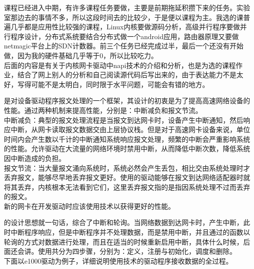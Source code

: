 \documentclass[fontsize=11pt, %
                             paper=a4, %
                             oneside, %
                             captions=tableheading,
                             index=totoc,
                             hyperref]{labbook}
\begin{document}
\begin{addmargin}[0cm]{0cm} %

\pagestyle{scrheadings} %

\indent 课程已经进入中期，有许多课程任务要做，主要是前期拖延积攒下来的任务。实验室那边去的事情不多，所以这段时间去的比较少，于是便以课程为主。我选的课普遍几乎都是应用性比较强的课程，Linux内核要做源码分析，高级并行程序要做并行程序设计，分布式系统要结合分布式做一个android应用，路由器原理又要做netmagic平台上的SDN计数器。前三个任务已经完成过半，最后一个还没有开始做，因为我的硬件基础几乎等于0，所以比较吃力。\\
\indent 后面的内容是有关于内核网卡驱动中napi技术的介绍和分析，也是为选的课程作业，结合了网上别人的分析和自己阅读源代码后写出来的，由于表达能力不是太好，写得可能不是太明白，同时限于水平问题，可能会有错的地方。

\indent {}是对设备驱动程序报文处理的一个框架，其设计的初衷是为了提高高速网络设备的性能。通过两种机制来提高性能，分别是：中断减负和报文节流。\\
\indent 中断减负：典型的报文处理流程是当报文到达网卡时，设备产生中断通知，然后响应中断，从网卡读取报文数据交由上层协议栈。但是对于高速网卡设备来说，单位时间内会产生数以千计的中断通知系统响应报文处理，频繁的中断会严重影响系统的性能。允许驱动在大流量的网络环境时禁用中断，从而降低中断次数，降低系统因中断造成的负担。\\
\indent 报文节流：当大量报文涌向系统时，系统必然会产生丢包，相比交由系统处理时才丢弃报文，能够尽早地丢弃报文更好。使用的驱动能够在报文到达网络适配器时就将其丢弃，内核根本无法看到它们，这里丢弃报文指的是指因系统处理不过而丢弃的报文。\\
\indent 新的网卡在开发驱动时应该使用技术以获得更好的性能。

\indent {}的设计思想就一句话，综合了中断和轮询。当网络数据到达网卡时，产生中断，此时中断程序响应，但是中断程序并不处理数据，而是禁用中断，并且通过的函数以轮询的方式对数据进行处理，而且在适当的时候重新启用中断，具体什么时候，后面还会讲。使用共分为四步骤，分别为：定义，注册与初始化，调度和删除。\\
\indent 下面以e1000驱动为例子，详细说明使用技术的驱动程序接收数据的全过程。\\


\end{addmargin}
\end{document}
